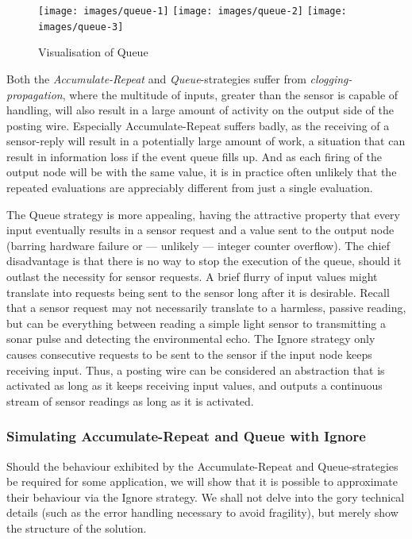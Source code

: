 \documentclass[a4paper, oneside, final]{memoir}
\begin{document}
\begin{figure}
  \texttt{[image: images/queue-1]}
  \texttt{[image: images/queue-2]}
  \texttt{[image: images/queue-3]}
  \caption{Visualisation of Queue}
  \centering
  \label{fig:queue}
\end{figure}

Both the \textit{Accumulate-Repeat} and \textit{Queue}-strategies
suffer from \textit{clogging-propagation}, where the multitude of
inputs, greater than the sensor is capable of handling, will also
result in a large amount of activity on the output side of the posting
wire.  Especially Accumulate-Repeat suffers badly, as the receiving of
a sensor-reply will result in a potentially large amount of work, a
situation that can result in information loss if the event queue fills
up.  And as each firing of the output node will be with the same
value, it is in practice often unlikely that the repeated evaluations
are appreciably different from just a single evaluation.

The Queue strategy is more appealing, having the attractive property
that every input eventually results in a sensor request and a value
sent to the output node (barring hardware failure or --- unlikely ---
integer counter overflow).  The chief disadvantage is that there is no
way to stop the execution of the queue, should it outlast the
necessity for sensor requests.  A brief flurry of input values might
translate into requests being sent to the sensor long after it is
desirable.  Recall that a sensor request may not necessarily translate
to a harmless, passive reading, but can be everything between reading
a simple light sensor to transmitting a sonar pulse and detecting the
environmental echo.  The Ignore strategy only causes consecutive
requests to be sent to the sensor if the input node keeps receiving
input.  Thus, a posting wire can be considered an abstraction that is
activated as long as it keeps receiving input values, and outputs a
continuous stream of sensor readings as long as it is activated.

\subsubsection{Simulating Accumulate-Repeat and Queue with Ignore}

Should the behaviour exhibited by the Accumulate-Repeat and
Queue-strategies be required for some application, we will
show that it is possible to approximate their behaviour via the
Ignore strategy.  We shall not delve into the gory technical details
(such as the error handling necessary to avoid fragility), but
merely show the structure of the solution.
\end{document}
